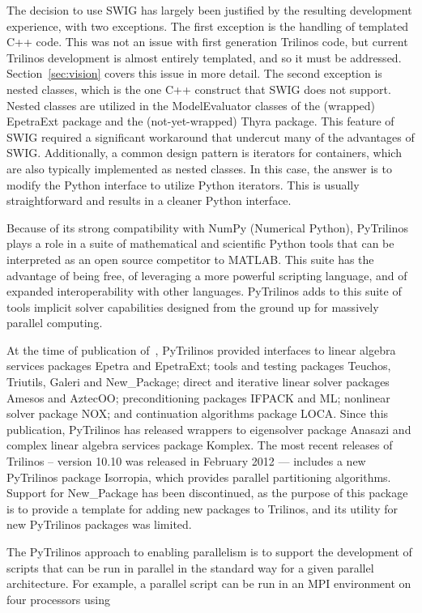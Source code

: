 \documentclass[11pt]{article}
\begin{document}
The decision to use SWIG has largely been justified by the resulting development experience, with two exceptions.  The first exception is the handling of templated C++ code.  This was not an issue with first generation Trilinos code, but current Trilinos development is almost entirely templated, and so it must be addressed.  Section~\ref{sec:vision} covers this issue in more detail.  The second exception is nested classes, which is the one C++ construct that SWIG does not support.  Nested classes are utilized in the ModelEvaluator classes of the (wrapped) EpetraExt package and the (not-yet-wrapped) Thyra package.  This feature of SWIG required a significant workaround that undercut many of the advantages of SWIG.  Additionally, a common design pattern is iterators for containers, which are also typically implemented as nested classes.  In this case, the answer is to modify the Python interface to utilize Python iterators.  This is usually straightforward and results in a cleaner Python interface.

Because of its strong compatibility with NumPy (Numerical Python), PyTrilinos plays a role in a suite of mathematical and scientific Python tools that can be interpreted as an open source competitor to MATLAB.  This suite has the advantage of being free, of leveraging a more powerful scripting language, and of expanded interoperability with other languages.  PyTrilinos adds to this suite of tools implicit solver capabilities designed from the ground up for massively parallel computing.

At the time of publication of~\cite{PyTrilinos}, PyTrilinos provided interfaces to linear algebra services packages Epetra and EpetraExt; tools and testing packages Teuchos, Triutils, Galeri and New\_Package; direct and iterative linear solver packages Amesos and AztecOO; preconditioning packages IFPACK and ML; nonlinear solver package NOX; and continuation algorithms package LOCA.  Since this publication, PyTrilinos has released wrappers to eigensolver package Anasazi and complex linear algebra services package Komplex.  The most recent releases of Trilinos -- version 10.10 was released in February 2012 --- includes a new PyTrilinos package Isorropia, which provides parallel partitioning algorithms.  Support for New\_Package has been discontinued, as the purpose of this package is to provide a template for adding new packages to Trilinos, and its utility for new PyTrilinos packages was limited.

The PyTrilinos approach to enabling parallelism is to support the development of scripts that can be run in parallel in the standard way for a given parallel architecture.  For example, a parallel script can be run in an MPI environment on four processors using
\end{document}
